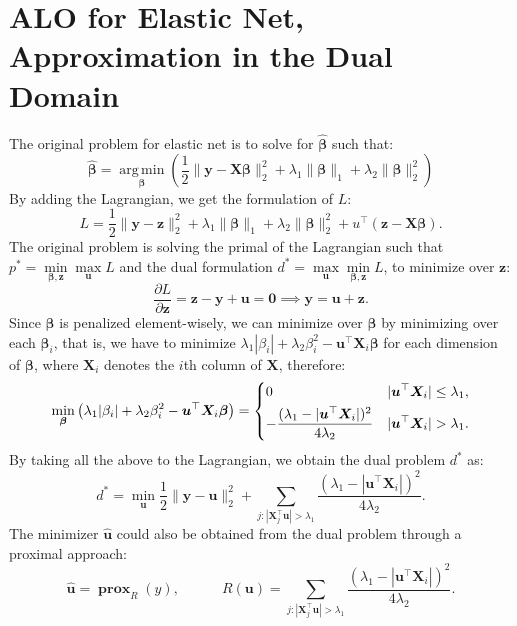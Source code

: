 \documentclass[11pt]{article}
\newcommand{\bu}{\bm{u}}
\newcommand{\by}{\bm{y}}
\newcommand{\bz}{\bm{z}}
\newcommand{\bX}{\bm{X}}
\newcommand{\bbeta}{\bm{\beta}}
\DeclareMathOperator{\bprox}{\mathbf{prox}}
\DeclareMathOperator*{\argmin}{arg\,min}
\begin{document}
\section{ALO for Elastic Net, Approximation in the Dual Domain}
The original problem for elastic net is to solve for $\hat{\bbeta}$ such that: 
\begin{equation}
\hat{\bbeta}=\argmin\limits_{\bbeta}\left(\frac{1}{2}\|\by-\bX\bbeta\|_{2}^{2} + \lambda_{1}\|\bbeta\|_{1}+\lambda_{2}\|\bbeta\|_{2}^{2}\right)
\end{equation} 
By adding the Lagrangian, we get the formulation of $L$: 
	\begin{equation}
	L = \frac{1}{2}\|\by-\bz\|_{2}^{2} + \lambda_{1}\|\bbeta\|_{1}+\lambda_{2}\|\bbeta\|_{2}^{2}+u^{\top}(\bz-\bX\bbeta).
	\end{equation}
The original problem is solving the primal of the Lagrangian such that $p^{*} = \min\limits_{\bbeta,\bz}\max\limits_{\bu}L$ and the dual formulation $d^{*} = \max\limits_{\bu}\min\limits_{\bbeta,\bz}L$, to minimize over $\bz$: \[\frac{\partial L}{\partial \bz} = \bz -\by +\bu = \bm{0}\implies \by = \bu + \bz.\] Since $\bbeta$ is penalized element-wisely, we can minimize over $\bbeta$ by minimizing over each $\bbeta_{i}$, that is, we have to minimize $\lambda_{1}|\beta_{i}| + \lambda_{2}\beta_{i}^{2} - \bu^{\top}\bX_{i}\bbeta$ for each dimension of $\bbeta$, where $\bX_{i}$ denotes the $i$th column of $\bX$, therefore: \[\min\limits_{\bbeta}\left(\lambda_{1}|\beta_{i}| + \lambda_{2}\beta_{i}^{2} - \bu^{\top}\bX_{i}\bbeta\right)=\begin{dcases}
0 & |\bu^{\top}\bX_{i}| \leq \lambda_{1},\\
-\frac{(\lambda_{1}-|\bu^{\top}\bX_{i}|)^{2}}{4\lambda_{2}} & |\bu^{\top}\bX_{i}| > \lambda_{1}.
\end{dcases}\] By taking all the above to the Lagrangian, we obtain the dual problem $d^{*}$ as: 
	\begin{equation}
	d^{*} = \min\limits_{\bu}\frac{1}{2}\|\by-\bu\|_{2}^{2} + \sum_{j: |\bX_{j}^{\top}\bu| > \lambda_{1}}\frac{(\lambda_{1}-|\bu^{\top}\bX_{i}|)^{2}}{4\lambda_{2}}.
	\end{equation}
The minimizer $\hat{\bu}$ could also be obtained from the dual problem through a proximal approach: \[\hat{\bu} = \bprox_{R}(y),\qquad\quad R(\bu) = \sum_{j:|\bX_{j}^{\top}\bu| > \lambda_{1}}\frac{(\lambda_{1}-|\bu^{\top}\bX_{i}|)^{2}}{4\lambda_{2}}.\]
\end{document}
